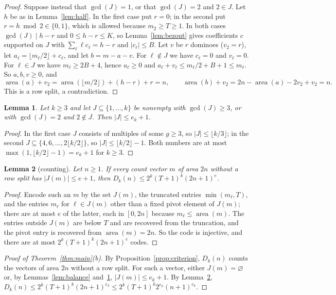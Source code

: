 \documentclass[11pt]{article}
\newtheorem{lemma}{Lemma}
\theoremstyle{definition}
\theoremstyle{remark}
\newcommand{\area}{\operatorname{area}}
\begin{document}
\begin{proof}
Suppose instead that $\gcd(J)=1$, or that $\gcd(J)=2$ and $2\in J$. Let $h$
be as in Lemma~\ref{lem:half}. In the first case put $r=0$; in the second put
$r=h\bmod 2\in\{0,1\}$, which is allowed because $m_2\ge T\ge1$. In both cases
$\gcd(J)\mid h-r$ and $0\le h-r\le K$, so Lemma~\ref{lem:bezout} gives
coefficients $c$ supported on $J$ with $\sum_\ell\ell c_\ell=h-r$ and
$|c_\ell|\le B$. Let $v$ be $r$ dominoes ($v_2=r$), let
$a_\ell=\lfloor m_\ell/2\rfloor+c_\ell$, and let $b=m-a-v$. For $\ell\notin J$
we have $c_\ell=0$ and $v_\ell=0$. For $\ell\in J$ we have $m_\ell\ge2B+4$,
hence $a_\ell\ge0$ and $a_\ell+v_\ell\le m_\ell/2+B+1\le m_\ell$. So
$a,b,v\ge0$, and
\[
\area(a)+v_2=\area(\lfloor m/2\rfloor)+(h-r)+r=n,\qquad
\area(b)+v_2=2n-\area(a)-2v_2+v_2=n .
\]
This is a row split, a contradiction.
\end{proof}

\begin{lemma}\label{lem:sparse}
Let $k\ge3$ and let $J\subseteq\{1,\dots,k\}$ be nonempty with $\gcd(J)\ge3$,
or with $\gcd(J)=2$ and $2\notin J$. Then $|J|\le e_k+1$.
\end{lemma}

\begin{proof}
In the first case $J$ consists of multiples of some $g\ge3$, so
$|J|\le\lfloor k/3\rfloor$; in the second $J\subseteq\{4,6,\dots,2\lfloor
k/2\rfloor\}$, so $|J|\le\lfloor k/2\rfloor-1$. Both numbers are at most
$\max(1,\lfloor k/2\rfloor-1)=e_k+1$ for $k\ge3$.
\end{proof}

\begin{lemma}[counting]\label{lem:count}
Let $n\ge1$. If every count vector $m$ of area $2n$ without a row split has
$|J(m)|\le e+1$, then $D_k(n)\le 2^k(T+1)^k(2n+1)^{e}$.
\end{lemma}

\begin{proof}
Encode such an $m$ by the set $J(m)$, the truncated entries
$\min(m_\ell,T)$, and the entries $m_\ell$ for $\ell\in J(m)$ other than a
fixed pivot element of $J(m)$; there are at most $e$ of the latter, each in
$[0,2n]$ because $m_\ell\le\area(m)$. The entries outside $J(m)$ are below $T$
and are recovered from the truncation, and the pivot entry is recovered from
$\area(m)=2n$. So the code is injective, and there are at most
$2^k(T+1)^k(2n+1)^e$ codes.
\end{proof}

\begin{proof}[Proof of Theorem~\ref{thm:main}(b)]
By Proposition~\ref{prop:criterion}, $D_k(n)$ counts the vectors of area $2n$
without a row split. For such a vector, either $J(m)=\varnothing$ or, by
Lemmas~\ref{lem:balance} and~\ref{lem:sparse}, $|J(m)|\le e_k+1$. By
Lemma~\ref{lem:count}, $D_k(n)\le 2^k(T+1)^k(2n+1)^{e_k}\le
2^k(T+1)^k2^{e_k}(n+1)^{e_k}$.
\end{proof}
\end{document}
